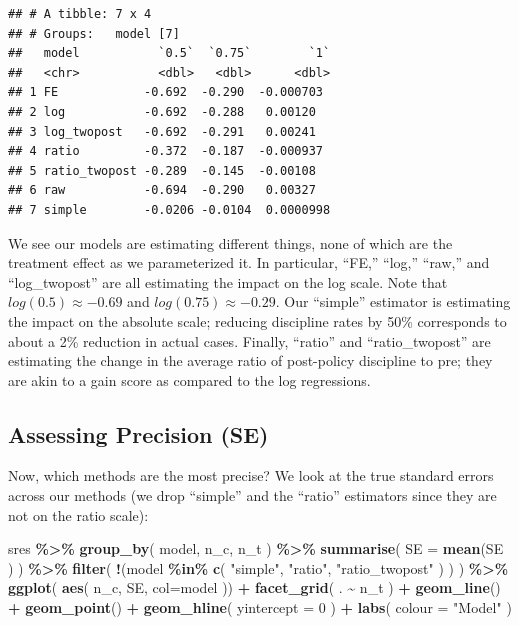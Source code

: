 \documentclass[
]{book}
\newenvironment{Shaded}{\begin{snugshade}}{\end{snugshade}}
\newcommand{\AttributeTok}[1]{\textcolor[rgb]{0.13,0.29,0.53}{#1}}
\newcommand{\DecValTok}[1]{\textcolor[rgb]{0.00,0.00,0.81}{#1}}
\newcommand{\FunctionTok}[1]{\textcolor[rgb]{0.13,0.29,0.53}{\textbf{#1}}}
\newcommand{\NormalTok}[1]{#1}
\newcommand{\SpecialCharTok}[1]{\textcolor[rgb]{0.81,0.36,0.00}{\textbf{#1}}}
\newcommand{\StringTok}[1]{\textcolor[rgb]{0.31,0.60,0.02}{#1}}
\begin{document}
\begin{verbatim}
## # A tibble: 7 x 4
## # Groups:   model [7]
##   model           `0.5`  `0.75`        `1`
##   <chr>           <dbl>   <dbl>      <dbl>
## 1 FE            -0.692  -0.290  -0.000703 
## 2 log           -0.692  -0.288   0.00120  
## 3 log_twopost   -0.692  -0.291   0.00241  
## 4 ratio         -0.372  -0.187  -0.000937 
## 5 ratio_twopost -0.289  -0.145  -0.00108  
## 6 raw           -0.694  -0.290   0.00327  
## 7 simple        -0.0206 -0.0104  0.0000998
\end{verbatim}

We see our models are estimating different things, none of which are the treatment effect as we parameterized it.
In particular, ``FE,'' ``log,'' ``raw,'' and ``log\_twopost'' are all estimating the impact on the log scale.
Note that \(log( 0.5 ) \approx -0.69\) and \(log( 0.75 ) \approx -0.29\).
Our ``simple'' estimator is estimating the impact on the absolute scale; reducing discipline rates by 50\% corresponds to about a 2\% reduction in actual cases.
Finally, ``ratio'' and ``ratio\_twopost'' are estimating the change in the average ratio of post-policy discipline to pre; they are akin to a gain score as compared to the log regressions.

\subsection{Assessing Precision (SE)}\label{assessing-precision-se}

Now, which methods are the most precise?
We look at the true standard errors across our methods (we drop ``simple'' and the ``ratio'' estimators since they are not on the ratio scale):

\begin{Shaded}
\begin{Highlighting}[]
\NormalTok{sres }\SpecialCharTok{\%\textgreater{}\%} 
  \FunctionTok{group\_by}\NormalTok{( model, n\_c, n\_t ) }\SpecialCharTok{\%\textgreater{}\%}
  \FunctionTok{summarise}\NormalTok{( }\AttributeTok{SE =} \FunctionTok{mean}\NormalTok{(SE ) ) }\SpecialCharTok{\%\textgreater{}\%}
  \FunctionTok{filter}\NormalTok{( }\SpecialCharTok{!}\NormalTok{(model }\SpecialCharTok{\%in\%} \FunctionTok{c}\NormalTok{( }\StringTok{"simple"}\NormalTok{, }\StringTok{"ratio"}\NormalTok{, }\StringTok{"ratio\_twopost"}\NormalTok{ ) ) ) }\SpecialCharTok{\%\textgreater{}\%}
  \FunctionTok{ggplot}\NormalTok{( }\FunctionTok{aes}\NormalTok{( n\_c, SE, }\AttributeTok{col=}\NormalTok{model )) }\SpecialCharTok{+}
    \FunctionTok{facet\_grid}\NormalTok{( . }\SpecialCharTok{\textasciitilde{}}\NormalTok{ n\_t ) }\SpecialCharTok{+}
    \FunctionTok{geom\_line}\NormalTok{() }\SpecialCharTok{+} \FunctionTok{geom\_point}\NormalTok{() }\SpecialCharTok{+}
    \FunctionTok{geom\_hline}\NormalTok{( }\AttributeTok{yintercept =} \DecValTok{0}\NormalTok{ ) }\SpecialCharTok{+}
  \FunctionTok{labs}\NormalTok{( }\AttributeTok{colour =} \StringTok{"Model"}\NormalTok{ )}
\end{Highlighting}
\end{Shaded}
\end{document}

